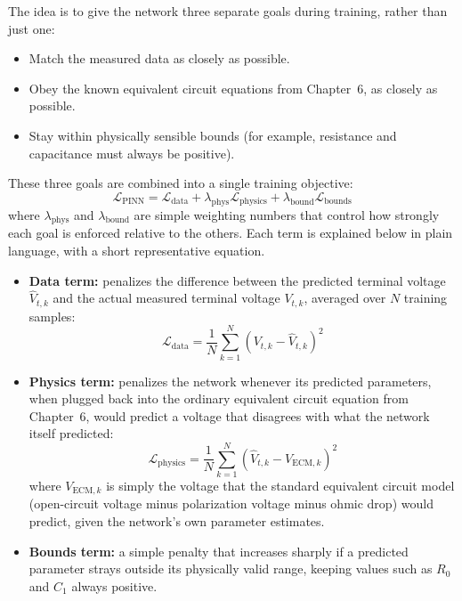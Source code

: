 The idea is to give the network three separate goals during training, rather than just one:
\begin{itemize}
    \item Match the measured data as closely as possible.
    \item Obey the known equivalent circuit equations from Chapter~6, as closely as possible.
    \item Stay within physically sensible bounds (for example, resistance and capacitance must always be positive).
\end{itemize}
These three goals are combined into a single training objective:
\begin{equation}
\mathcal{L}_{\text{PINN}} = \mathcal{L}_{\text{data}} + \lambda_{\text{phys}} \mathcal{L}_{\text{physics}} + \lambda_{\text{bound}} \mathcal{L}_{\text{bounds}}
\label{eq:ch8_pinn_loss_total}
\end{equation}
where $\lambda_{\text{phys}}$ and $\lambda_{\text{bound}}$ are simple weighting numbers that control how strongly each goal is enforced relative to the others. Each term is explained below in plain language, with a short representative equation.

\begin{itemize}
    \item \textbf{Data term:} penalizes the difference between the predicted terminal voltage $\hat V_{t,k}$ and the actual measured terminal voltage $V_{t,k}$, averaged over $N$ training samples:
    \begin{equation}
    \mathcal{L}_{\text{data}} = \frac{1}{N} \sum_{k=1}^N \left( V_{t,k} - \hat{V}_{t,k} \right)^2
    \end{equation}
    \item \textbf{Physics term:} penalizes the network whenever its predicted parameters, when plugged back into the ordinary equivalent circuit equation from Chapter~6, would predict a voltage that disagrees with what the network itself predicted:
    \begin{equation}
    \mathcal{L}_{\text{physics}} = \frac{1}{N} \sum_{k=1}^N \left( \hat{V}_{t,k} - V_{\text{ECM},k} \right)^2
    \end{equation}
    where $V_{\text{ECM},k}$ is simply the voltage that the standard equivalent circuit model (open-circuit voltage minus polarization voltage minus ohmic drop) would predict, given the network's own parameter estimates.
    \item \textbf{Bounds term:} a simple penalty that increases sharply if a predicted parameter strays outside its physically valid range, keeping values such as $R_0$ and $C_1$ always positive.
\end{itemize}

